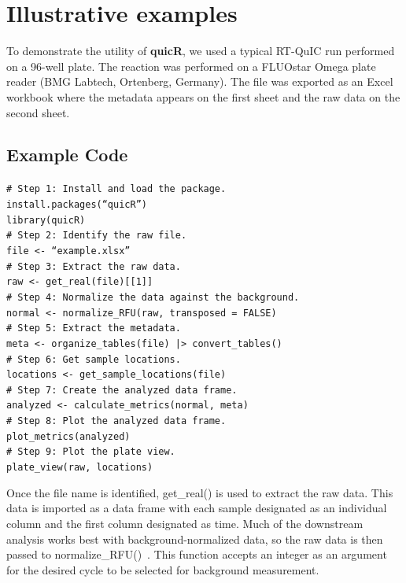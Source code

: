\documentclass[preprint,12pt,a4paper]{elsarticle}
\begin{document}
    \section{Illustrative examples}
        To demonstrate the utility of \textbf{quicR}, we used a typical RT-QuIC run performed on a 96-well plate. The reaction was performed on a FLUOstar Omega plate reader (BMG Labtech, Ortenberg, Germany). The file was exported as an Excel workbook where the metadata appears on the first sheet and the raw data on the second sheet.
        
        \subsection{Example Code}
            \texttt{\# Step 1: Install and load the package.\\
            install.packages(``quicR'')\\
            library(quicR)\\
            \# Step 2: Identify the raw file.\\
            file <- ``example.xlsx''\\
            \# Step 3: Extract the raw data.\\
            raw <- get\_real(file)[[1]]\\
            \# Step 4: Normalize the data against the background.\\
            normal <- normalize\_RFU(raw, transposed = FALSE)\\
            \# Step 5: Extract the metadata.\\
            meta <- organize\_tables(file) |> convert\_tables()\\
            \# Step 6: Get sample locations.\\
            locations <- get\_sample\_locations(file)\\
            \# Step 7: Create the analyzed data frame.\\
            analyzed <- calculate\_metrics(normal, meta)\\
            \# Step 8: Plot the analyzed data frame.\\
            plot\_metrics(analyzed)\\
            \# Step 9: Plot the plate view.\\
            plate\_view(raw, locations)\\}

            Once the file name is identified, get\_real() is used to extract the raw data. This data is imported as a data frame with each sample designated as an individual column and the first column designated as time. Much of the downstream analysis works best with background-normalized data, so the raw data is then passed to normalize\_RFU()~\cite{Rowden2023}. This function accepts an integer as an argument for the desired cycle to be selected for background measurement. 
            
\end{document}

